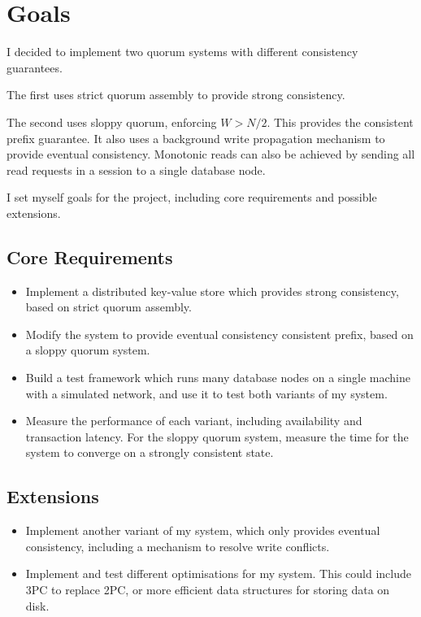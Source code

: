 \documentclass[12pt,a4paper,twoside,openany]{report}
\begin{document}
\section{Goals} \label{goals}

I decided to implement two quorum systems with different consistency guarantees.

The first uses strict quorum assembly to provide strong consistency.

The second uses sloppy quorum, enforcing $W > N/2$. This provides the consistent prefix guarantee. It also uses a background write propagation mechanism to provide eventual consistency. Monotonic reads can also be achieved by sending all read requests in a session to a single database node.

I set myself goals for the project, including core requirements and possible extensions.

\subsection{Core Requirements}

\begin{itemize}
\item
Implement a distributed key-value store which provides strong consistency, based on strict quorum assembly.

\item
Modify the system to provide eventual consistency consistent prefix, based on a sloppy quorum system.

\item
Build a test framework which runs many database nodes on a single machine with a simulated network, and use it to test both variants of my system.

\item
Measure the performance of each variant, including availability  and transaction latency. For the sloppy quorum system, measure the time for the system to converge on a strongly consistent state.

\end{itemize}

\subsection{Extensions}

\begin{itemize}
\item
Implement another variant of my system, which only provides eventual consistency, including a mechanism to resolve write conflicts.

\item
Implement and test different optimisations for my system. This could include 3PC to replace 2PC, or more efficient data structures for storing data on disk.

\end{itemize}
\end{document}
